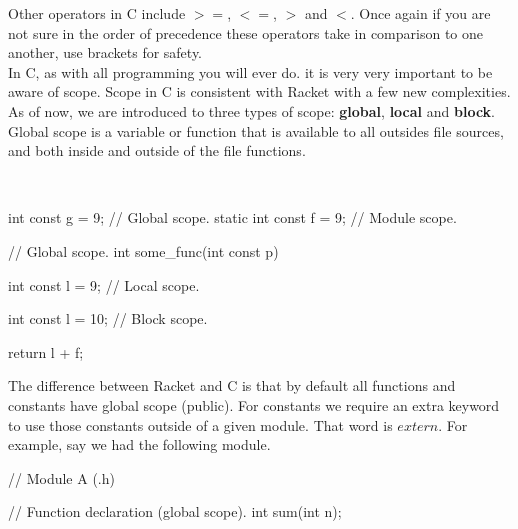 Other operators in C include $>=$, $<=$, $>$ and $<$.  Once again if you are not sure in the order of precedence these operators take in comparison to one another, use brackets for safety.\\

In C, as with all programming you will ever do. it is very very important to be aware of scope.  Scope in C is consistent with Racket with a few new complexities.  As of now, we are introduced to three types of scope: \textbf{global}, \textbf{local} and \textbf{block}.\\

 {
Global scope is a variable or function that is available to all outsides file sources, and both inside and outside of the file functions.
	}

	

\\

\begin{code}[C]
int const g = 9; // Global scope.
static int const f = 9; // Module scope.

// Global scope.
int some_func(int const p) 
{
	int const l = 9; // Local scope.
	
	{
	
		int const l = 10; // Block scope.
		
		return l + f;
	}
}
\end{code}

                 
The difference between Racket and C is that by default all functions and constants have global scope (public). For constants we require an extra keyword to use those constants outside of a given module. That word is $extern$.  For example, say we had the following module.\\

\begin{code}[C]
// Module A (.h)

// Function declaration (global scope).
int sum(int n);
\end{code}

